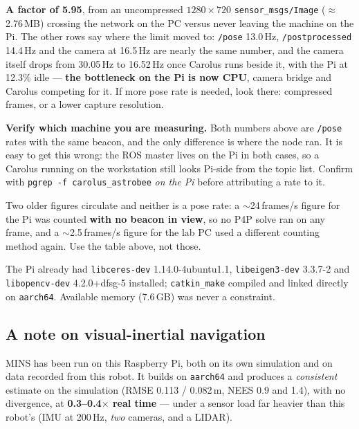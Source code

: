 \documentclass[11pt]{report}
\newenvironment{warningbox}%
  {\begin{lrbox}{\warnbox}\begin{minipage}{0.90\textwidth}}%
  {\end{minipage}\end{lrbox}%
   \begin{center}\fcolorbox{black}{codebg}{\usebox{\warnbox}}\end{center}}
\begin{document}
\textbf{A factor of 5.95}, from an uncompressed $1280\times720$
\texttt{sensor\_msgs/Image} ($\approx$2.76\,MB) crossing the network on the
PC versus never leaving the machine on the Pi. The other rows say where the
limit moved to: \texttt{/pose} 13.0\,Hz, \texttt{/postprocessed} 14.4\,Hz
and the camera at 16.5\,Hz are nearly the same number, and the camera itself
drops from 30.05\,Hz to 16.52\,Hz once Carolus runs beside it, with the Pi
at 12.3\% idle --- \textbf{the bottleneck on the Pi is now CPU}, camera
bridge and Carolus competing for it. If more pose rate is needed, look
there: compressed frames, or a lower capture resolution.

\begin{warningbox}
\textbf{Verify which machine you are measuring.} Both numbers above are
\texttt{/pose} rates with the same beacon, and the only difference is where
the node ran. It is easy to get this wrong: the ROS master lives on the Pi in
both cases, so a Carolus running on the workstation still looks Pi-side from
the topic list. Confirm with \texttt{pgrep -f carolus\_astrobee} \emph{on the
Pi} before attributing a rate to it.

Two older figures circulate and neither is a pose rate: a $\sim$24\,frames/s
figure for the Pi was counted \textbf{with no beacon in view}, so no P4P
solve ran on any frame, and a $\sim$2.5\,frames/s figure for the lab PC used
a different counting method again. Use the table above, not those.
\end{warningbox}

The Pi already had \texttt{libceres-dev} 1.14.0-4ubuntu1.1,
\texttt{libeigen3-dev} 3.3.7-2 and \texttt{libopencv-dev} 4.2.0+dfsg-5
installed; \texttt{catkin\_make} compiled and linked directly on
\texttt{aarch64}. Available memory (7.6\,GB) was never a constraint.

\subsection{A note on visual-inertial navigation}

MINS has been run on this Raspberry Pi, both on its own simulation and on
data recorded from this robot. It builds on \texttt{aarch64} and produces a \emph{consistent}
estimate on the simulation (RMSE 0.113\textdegree{} / 0.082\,m, NEES 0.9 and
1.4), with no divergence, at \textbf{0.3--0.4$\times$ real time} --- under a
sensor load far heavier than this robot's (IMU at 200\,Hz, \emph{two}
cameras, and a LIDAR).
\end{document}
